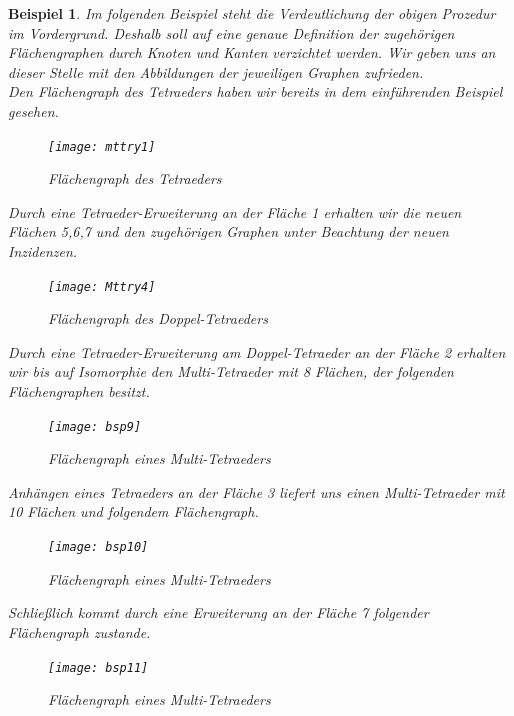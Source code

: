 \documentclass[12pt,titlepage,twoside,cleardoublepage]{article}
\theoremstyle{nummermitklammern}
\newtheorem{bsp}[temp]{Beispiel}
\newtheorem{bsp}[zahl]{Beispiel}
\numberwithin{equation}{section}
\begin{document}
\begin{bsp}
Im folgenden Beispiel steht die Verdeutlichung der obigen Prozedur im Vordergrund. Deshalb soll auf eine genaue Definition der zugehörigen Flächengraphen durch Knoten und Kanten verzichtet werden. Wir geben uns an dieser Stelle mit den Abbildungen der jeweiligen Graphen zufrieden. \\
Den Flächengraph des Tetraeders haben wir bereits in dem einführenden Beispiel gesehen.
\begin{figure}[H]
\begin{center}
\texttt{[image: mttry1]}

\end{center}
\caption{Flächengraph des Tetraeders}
\end{figure}
Durch eine Tetraeder-Erweiterung an der Fläche 1 erhalten wir die neuen Flächen 5,6,7 und den zugehörigen Graphen unter Beachtung der neuen Inzidenzen.
\begin{figure}[H]
\begin{center}
\texttt{[image: Mttry4]}
\end{center}
\caption{Flächengraph des Doppel-Tetraeders}
\end{figure}
Durch eine Tetraeder-Erweiterung am Doppel-Tetraeder an der Fläche 2 erhalten wir bis auf Isomorphie den Multi-Tetraeder mit 8 Flächen, der folgenden Flächengraphen besitzt. 
\begin{figure}[H]
\begin{center}
\texttt{[image: bsp9]}
\end{center}
\caption{Flächengraph eines Multi-Tetraeders}
\end{figure}
Anhängen eines Tetraeders an der Fläche 3 liefert uns einen Multi-Tetraeder mit 10 Flächen und folgendem Flächengraph.
\begin{figure}[H]
\begin{center}
\texttt{[image: bsp10]}
\end{center}
\caption{Flächengraph eines Multi-Tetraeders}
\end{figure}
Schließlich kommt durch eine Erweiterung an der Fläche 7 folgender Flächengraph zustande.
\begin{figure}[H]
\begin{center}
\texttt{[image: bsp11]}
\end{center}
\caption{Flächengraph eines Multi-Tetraeders}
\end{figure}
\end{bsp}
\end{document}

